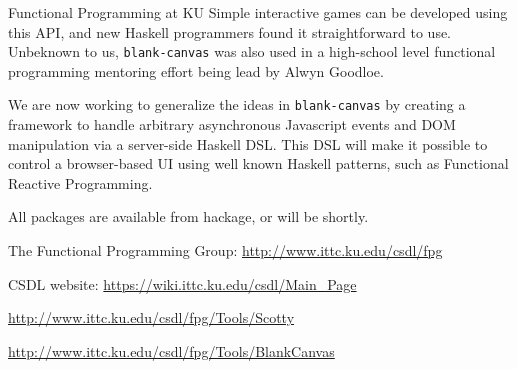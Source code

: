 \begin{hcarentry}{Functional Programming at KU}
Simple interactive games can be developed using this API,
and new Haskell programmers found it straightforward to use.
Unbeknown to us, {\tt blank-canvas} was also used in a high-school
level functional programming mentoring effort being lead by Alwyn Goodloe.

We are now working to generalize the ideas in {\tt blank-canvas} by
creating a framework to handle arbitrary asynchronous Javascript events
and DOM manipulation via a server-side Haskell DSL. This DSL will make it possible to control
a browser-based UI using well known Haskell patterns, such as Functional
Reactive Programming.

All packages are available from hackage, or will be shortly.

\FurtherReading
\begin{compactitem}
\item   The Functional Programming Group:
    \url{http://www.ittc.ku.edu/csdl/fpg}
\item
  CSDL website: \url{https://wiki.ittc.ku.edu/csdl/Main_Page}
\item \url{http://www.ittc.ku.edu/csdl/fpg/Tools/Scotty}
\item \url{http://www.ittc.ku.edu/csdl/fpg/Tools/BlankCanvas}
\end{compactitem}
\end{hcarentry}
